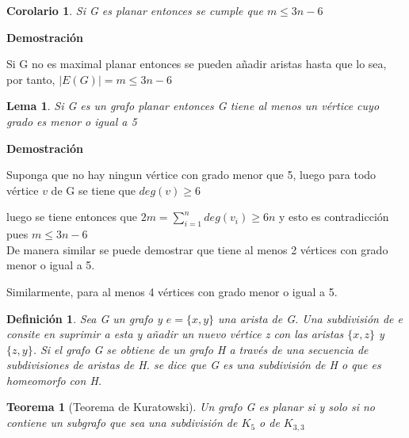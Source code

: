 \documentclass[a4paper,1pt]{report}
\newtheorem*{teo}{Teorema}
\newtheorem*{cor}{Corolario}
\newtheorem*{dfn}{Definición}
\newtheorem*{lem}{Lema}
\begin{document}
\begin{cor}
 Si G es planar entonces se cumple que $m\leq3n-6$
\end{cor}

\textbf{Demostración}

Si G no es maximal planar entonces se pueden añadir aristas hasta que lo sea, por tanto, 
$|E(G)|=m\leq3n-6$

\begin{lem}
 Si G es un grafo planar entonces G tiene al menos un vértice cuyo grado es menor o igual a 5
\end{lem}

\textbf{Demostración}

Suponga que no hay ningun vértice con grado menor que 5, luego para todo vértice $v$ de G se tiene que $deg(v)\geq 6$

luego se tiene entonces que $2m=\sum^n_{i=1} deg(v_i)\geq 6n$ y esto es contradicción pues $m\leq3n-6$\\

De manera similar se puede demostrar que tiene al menos 2 vértices con grado menor o igual a 5.

Similarmente, para al menos 4  vértices con grado menor o igual a 5.


\begin{dfn}
 Sea G un grafo y $e=\{x,y\}$ una arista de G. Una subdivisión de e consite en suprimir a esta y añadir un nuevo vértice z con las aristas $\{x,z\}$  y $\{z,y\}$. Si el grafo G se obtiene de un grafo H a través de una secuencia de subdivisiones de aristas de H. se dice que G es una subdivisión de H o que es homeomorfo con H.
\end{dfn}   

\begin{teo}[Teorema de Kuratowski]
 Un grafo G es planar si y solo si no contiene un subgrafo que sea una subdivisión de $K_5$ o de $K_{3,3}$
\end{teo}
\end{document}
